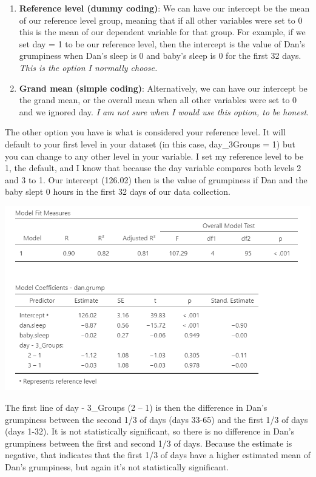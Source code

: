\documentclass[
]{book}
\providecommand{\tightlist}{%
  \setlength{\itemsep}{0pt}\setlength{\parskip}{0pt}}
\begin{document}
\begin{enumerate}
\def\labelenumi{\arabic{enumi}.}
\tightlist
\item
  \textbf{Reference level (dummy coding)}: We can have our intercept be the mean of our reference level group, meaning that if all other variables were set to 0 this is the mean of our dependent variable for that group. For example, if we set day = 1 to be our reference level, then the intercept is the value of Dan's grumpiness when Dan's sleep is 0 and baby's sleep is 0 for the first 32 days. \emph{This is the option I normally choose.}
\item
  \textbf{Grand mean (simple coding)}: Alternatively, we can have our intercept be the grand mean, or the overall mean when all other variables were set to 0 and we ignored day. \emph{I am not sure when I would use this option, to be honest}.
\end{enumerate}

The other option you have is what is considered your reference level. It will default to your first level in your dataset (in this case, day\_3Groups = 1) but you can change to any other level in your variable. I set my reference level to be 1, the default, and I know that because the day variable compares both levels 2 and 3 to 1. Our intercept (126.02) then is the value of grumpiness if Dan and the baby slept 0 hours in the first 32 days of our data collection.

\includegraphics{images/13-regression/regression-categorical.png}

The first line of day - 3\_Groups (2 -- 1) is then the difference in Dan's grumpiness between the second 1/3 of days (days 33-65) and the first 1/3 of days (days 1-32). It is not statistically significant, so there is no difference in Dan's grumpiness between the first and second 1/3 of days. Because the estimate is negative, that indicates that the first 1/3 of days have a higher estimated mean of Dan's grumpiness, but again it's not statistically significant.
\end{document}
